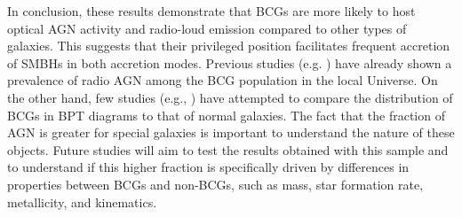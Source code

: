 In conclusion, these results demonstrate that BCGs are more likely to host optical AGN activity
and radio-loud emission compared to other types of galaxies.
This suggests that their privileged position facilitates frequent accretion of SMBHs in both
accretion modes. Previous studies (e.g.  \cite{2016MNRAS.460.3669Y, 2014MNRAS.440..762O, 2007MNRAS.379..867V}) have already shown a prevalence of radio AGN among the BCG
population in the local Universe. On the other hand, few studies (e.g., \cite{2019CoBAO..66..153F, 2007MNRAS.379..867V}) have attempted to
compare the distribution of BCGs in BPT diagrams to that of normal galaxies. The fact that the
fraction of AGN is greater for special galaxies is important to understand the
nature of these objects. Future studies will aim to test the results obtained with this sample and to
understand if this higher fraction is specifically driven by differences in properties between BCGs
and non-BCGs, such as mass, star formation rate, metallicity, and kinematics.

